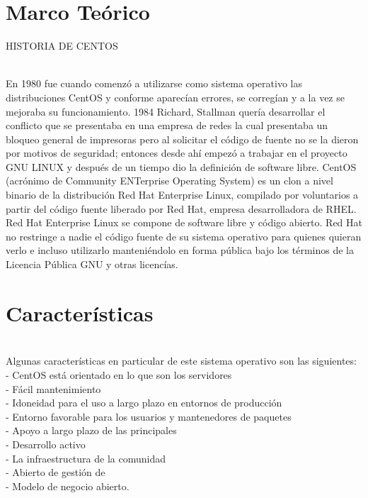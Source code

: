 \section{Marco Teórico} 
\begin{itemize}
\begin{center}
\item HISTORIA DE CENTOS
\end{center}
\\ En 1980 fue cuando comenzó a utilizarse como sistema operativo las distribuciones CentOS y conforme aparecían errores, se corregían y a la vez se mejoraba su funcionamiento. 1984 Richard, Stallman quería desarrollar el conflicto que se presentaba en una empresa de redes la cual presentaba un bloqueo general de impresoras pero al solicitar el código de fuente no se la dieron por motivos de seguridad; entonces desde ahí empezó a trabajar en el proyecto GNU LINUX y después de un tiempo dio la definición de software libre. CentOS (acrónimo de Community ENTerprise Operating System) es un clon a nivel binario de la distribución Red Hat Enterprise Linux, compilado por voluntarios a partir del código fuente liberado por Red Hat, empresa desarrolladora de RHEL. Red Hat Enterprise Linux se compone de software libre y código abierto. Red Hat no restringe a nadie el código fuente de su sistema operativo para quienes quieran verlo e incluso utilizarlo manteniéndolo en forma pública bajo los términos de la Licencia Pública GNU y otras licencías.\\

\end{itemize} 

\section{Características} 
\begin{itemize}
\\  Algunas características en particular de este sistema operativo son las siguientes:
\\- CentOS está orientado en lo que son los servidores
\\-	Fácil mantenimiento
\\-	Idoneidad para el uso a largo plazo en entornos de producción
\\-	Entorno favorable para los usuarios y mantenedores de paquetes
\\-	Apoyo a largo plazo de las principales
\\-	Desarrollo activo
\\-	La infraestructura de la comunidad
\\-	Abierto de gestión de
\\-	Modelo de negocio abierto.
\end{itemize} 

